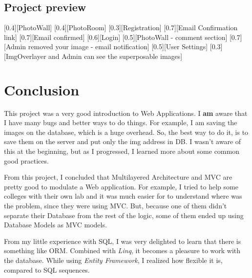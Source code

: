 \documentclass{article}
\begin{document}
		\subsection{Project preview}
			
			[0.4][PhotoWall]
			[0.4][PhotoRoom]
			[0.3][Registration]
			[0.7][Email Confirmation link]
			[0.7][Email confirmed]
			[0.6][Login]
			[0.5][PhotoWall - comment section]
			[0.7][Admin removed your image - email notification]
			[0.5][User Settings]
			[0.3][ImgOverlayer and Admin can see the superposable images]

	\section{Conclusion}
		This project was a very good introduction to Web Applications. I \textbf{am} aware that I have many bugs and better ways to do things. For example, I am saving the images on the database, which is a huge overhead. So, the best way to do it, is to save them on the server and put only the img address in DB. I wasn't aware of this at the beginning, but as I progressed, I learned more about some common good practices.

		From this project, I concluded that Multilayered Architecture and MVC are pretty good to modulate a Web application. For example, I tried to help some colleges with their own lab and it was much easier for to understand where was the problem, since they were using MVC. But, because one of them didn't separate their Database from the rest of the logic, some of them ended up using Database Models as MVC models.

		From my little experience with SQL, I was very delighted to learn that there is something like ORM. Combined with \textit{Linq}, it becomes a pleasure to work with the database. While using \textit{Entity Framework}, I realized how flexible it is, compared to SQL sequences. 
\end{document}
